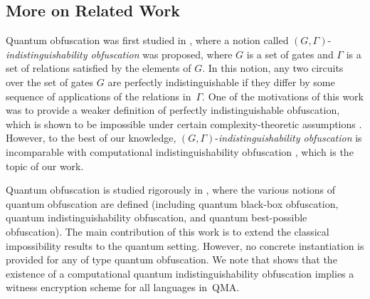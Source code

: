 \subsection{More on Related Work}
\label{sec:obf-quantum}
Quantum obfuscation was first studied in \cite{AJJ14}, where a notion called
$(G,\Gamma)$-{\em indistinguishability obfuscation} was proposed,  where $G$ is a set of gates and $\Gamma$ is a set of relations satisfied by the elements of $G$. In this notion, any two circuits over the set of gates $G$ are perfectly indistinguishable if they differ by some sequence of applications of the relations in~$\Gamma.$ One of the motivations of this work was to provide a weaker definition of perfectly indistinguishable obfuscation, which is shown to be impossible under certain complexity-theoretic assumptions \cite{AJJ14}. However, to the best of our knowledge, $(G,\Gamma)$-{\em indistinguishability obfuscation} is incomparable with computational indistinguishability obfuscation \cite{BGI+12, GGH+13}, which is the topic of our work.


Quantum obfuscation is studied rigorously in \cite{AF16arxiv}, where the various notions of quantum obfuscation are defined (including quantum black-box obfuscation, quantum indistinguishability obfuscation, and quantum best-possible obfuscation).
 The main contribution of this work is to extend the classical impossibility results to the quantum setting.
 However, no concrete instantiation is provided  for any of type quantum obfuscation.
  We note that  \cite{AF16arxiv} shows that the existence of a computational quantum indistinguishability obfuscation implies a witness encryption scheme for all languages in~\textsf{QMA}.


%
%


